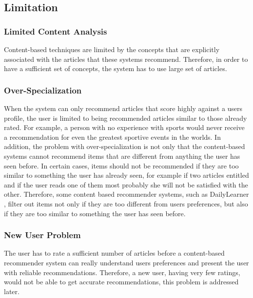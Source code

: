 \subsection{Limitation}
\subsubsection{Limited Content Analysis}
Content-based techniques are limited by the concepts that are explicitly associated with the articles that these systems recommend. Therefore, in order to have a sufficient set of concepts, the system has to use large set of articles.

\subsubsection{Over-Specialization}
When the system can only recommend articles that score highly against a users profile, the user is limited to being recommended articles similar to those already rated. For example, a person with no experience with sports would never receive a recommendation for even the greatest sportive events in the worlds. In addition, the problem with over-specialization is not only that the content-based systems cannot recommend items that are different from anything the user has seen before. In certain cases, items should not be recommended if they are too similar to something the user has already seen, for example if two articles entitled  and  if the user reads one of them most probably she will not be satisfied with the other. Therefore, some content based recommender systems, such as DailyLearner \citep{recom_13}, filter out items not only if they are too different from users preferences, but also if they are too similar to something the user has seen before.

\subsubsection{New User Problem}
The user has to rate a sufficient number of articles before a content-based recommender system can really understand users preferences and present the user with reliable recommendations. Therefore, a new user, having very few ratings, would not be able to get accurate recommendations, this problem is addressed later.

